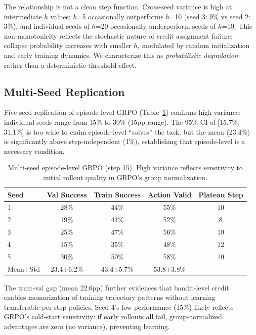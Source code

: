 \documentclass{article}
\begin{document}
The relationship is not a clean step function. Cross-seed variance is high at intermediate $h$ values: $h$=5 occasionally outperforms $h$=10 (seed 3: 9\% vs seed 2: 3\%), and individual seeds of $h$=20 occasionally underperform seeds of $h$=10. This non-monotonicity reflects the stochastic nature of credit assignment failure: collapse probability increases with smaller $h$, modulated by random initialization and early training dynamics. We characterize this as \emph{probabilistic degradation} rather than a deterministic threshold effect.

\subsection{Multi-Seed Replication}

Five-seed replication of episode-level GRPO (Table~\ref{tab:multiseed}) confirms high variance: individual seeds range from 15\% to 30\% (15pp range). The 95\% CI of [15.7\%, 31.1\%] is too wide to claim episode-level ``solves'' the task, but the mean (23.4\%) is significantly above step-independent (1\%), establishing that episode-level is a necessary condition.

\begin{table}[h]
\centering
\caption{Multi-seed episode-level GRPO (step 15). High variance reflects sensitivity to initial rollout quality in GRPO's group normalization.}
\label{tab:multiseed}
\begin{tabular}{lcccc}
\toprule
Seed & Val Success & Train Success & Action Valid & Plateau Step \\
\midrule
1 & 28\% & 44\% & 55\% & 10 \\
2 & 19\% & 41\% & 52\% & 8 \\
3 & 25\% & 47\% & 56\% & 10 \\
4 & 15\% & 35\% & 48\% & 12 \\
5 & 30\% & 50\% & 58\% & 10 \\
\midrule
Mean$\pm$Std & 23.4$\pm$6.2\% & 43.4$\pm$5.7\% & 53.8$\pm$3.8\% & -- \\
\bottomrule
\end{tabular}
\end{table}

The train-val gap (mean 22.6pp) further evidences that bandit-level credit enables memorization of training trajectory patterns without learning transferable per-step policies. Seed 4's low performance (15\%) likely reflects GRPO's cold-start sensitivity: if early rollouts all fail, group-normalized advantages are zero (no variance), preventing learning.
\end{document}
